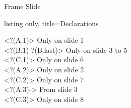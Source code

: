 \documentclass {beamer}
\begin{document}
\begin{frame}[fragile, t]
  {\Large Frame \insertframenumber}
  {\Large Slide \insertslidenumber}
\begin{tcblisting}{listing only, title=Declarations}
\end{tcblisting}
\visible<?(A.1)> {Only on slide 1 }\\
\visible<?(B.1)-?(B.last)> {Only on slide 3  to 5 }\\
\visible<?(C.1)> {Only on slide 6 }\\
\visible<?(A.2)> {Only on slide 2 }\\
\visible<?(C.2)> {Only on slide 7 }\\
\visible<?(A.3)-> {From slide 3 }\\
\visible<?(C.3)> {Only on slide 8 }\\
\end{frame}
\end{document}
